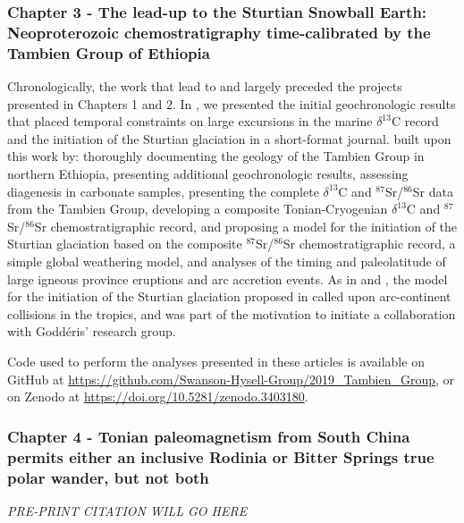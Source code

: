 \documentclass{ucbthesis}
\newcommand{\dC}{$\delta^{13}$C\xspace}
\newcommand{\SrSr}{$^{87}$Sr/$^{86}$Sr\xspace}
\begin{document}
\begin{frontmatter}
\begin{preface}
\subsubsection*{Chapter 3 - The lead-up to the Sturtian Snowball Earth: Neoproterozoic chemostratigraphy time-calibrated by the Tambien Group of Ethiopia}

\noindent
{}

\medskip

\noindent
{}

\bigskip

Chronologically, the work that lead to \citet{MacLennan2018a} and \citet{Park2020a} largely preceded the projects presented in Chapters 1 and 2. In \citet{MacLennan2018a}, we presented the initial geochronologic results that placed temporal constraints on large excursions in the marine \dC record and the initiation of the Sturtian glaciation in a short-format journal. \citet{Park2020a} built upon this work by: thoroughly documenting the geology of the Tambien Group in northern Ethiopia, presenting additional geochronologic results, assessing diagenesis in carbonate samples, presenting the complete \dC and \SrSr data from the Tambien Group, developing a composite Tonian-Cryogenian \dC and \SrSr chemostratigraphic record, and proposing a model for the initiation of the Sturtian glaciation based on the composite \SrSr chemostratigraphic record, a simple global weathering model, and analyses of the timing and paleolatitude of large igneous province eruptions and arc accretion events. As in \citet{Swanson-Hysell2017a} and \citet{Macdonald2019a}, the model for the initiation of the Sturtian glaciation proposed in \citet{Park2020a} called upon arc-continent collisions in the tropics, and was part of the motivation to initiate a collaboration with Godd\'eris' research group.

Code used to perform the analyses presented in these articles is available on GitHub at \url{https://github.com/Swanson-Hysell-Group/2019_Tambien_Group}, or on Zenodo at \url{https://doi.org/10.5281/zenodo.3403180}.

\subsubsection*{Chapter 4 - Tonian paleomagnetism from South China permits either an inclusive Rodinia or Bitter Springs true polar wander, but not both}

\noindent
\textit{PRE-PRINT CITATION WILL GO HERE}


\end{preface}
\end{frontmatter}
\end{document}
